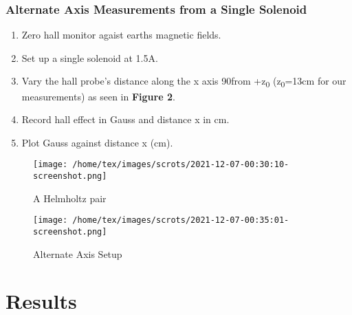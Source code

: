 \documentclass{article}
\begin{document}
   \subsubsection{Alternate Axis Measurements from a Single Solenoid}
   \begin{enumerate}
       \item Zero hall monitor agaist earths magnetic fields.
       \item Set up a single solenoid at 1.5A.
       \item Vary the hall probe's distance along the x axis 90\degree from +z\textsubscript{0} (z\textsubscript{0}=13cm for our measurements) as seen in \textbf{Figure 2}.
       \item Record hall effect in Gauss and distance x in cm.
       \item Plot Gauss against distance x (cm).
   \end{enumerate}
   \begin{figure}
       \centering
       \texttt{[image: /home/tex/images/scrots/2021-12-07-00:30:10-screenshot.png]}
       \caption{A Helmholtz pair}
   \end{figure}
   \begin{figure}
       \centering
       \texttt{[image: /home/tex/images/scrots/2021-12-07-00:35:01-screenshot.png]}
       \caption{Alternate Axis Setup}
   \end{figure}
   
   \section{Results}
\end{document}
